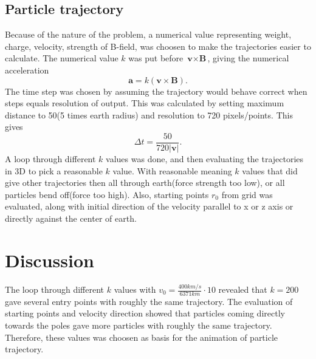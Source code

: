 \documentclass[11pt,a4paper]{article}
\begin{document}
\subsection{Particle trajectory}
Because of the nature of the problem, a numerical value representing weight, charge, velocity, strength of B-field, was choosen to make the trajectories easier to calculate.  The numerical value $k$ was put before $\textbf{v}\times\textbf{B}$, giving the numerical acceleration
\begin{equation}
\label{equation.numericalAcceleration}
\textbf{a} = k(\textbf{v}\times\textbf{B}).
\end{equation}
The time step was chosen by assuming the trajectory would behave correct when steps equals resolution of output. This was calculated by setting maximum distance to 50(5 times earth radius) and resolution to 720 pixels/points. This gives
\begin{equation}
\label{equation.dt}
\Delta t = \frac{50}{720|\textbf{v}|}.
\end{equation}
A loop through different $k$ values was done, and then evaluating the trajectories in 3D to pick a reasonable $k$ value. With reasonable meaning $k$ values that did give other trajectories then all through earth(force strength too low), or all particles bend off(force too high). Also, starting points $r_0$ from grid was evaluated, along with initial direction of the velocity parallel to x or z axis or directly against the center of earth.
\section{Discussion}
The loop through different $k$ values with $v_0=\frac{400km/s}{6371km}\cdot10$ revealed that $k=200$ gave several entry points with roughly the same trajectory. The evaluation of starting points and velocity direction showed that particles coming directly towards the poles gave more particles with roughly the same trajectory. Therefore, these values was choosen as basis for the animation of particle trajectory.
\end{document}
